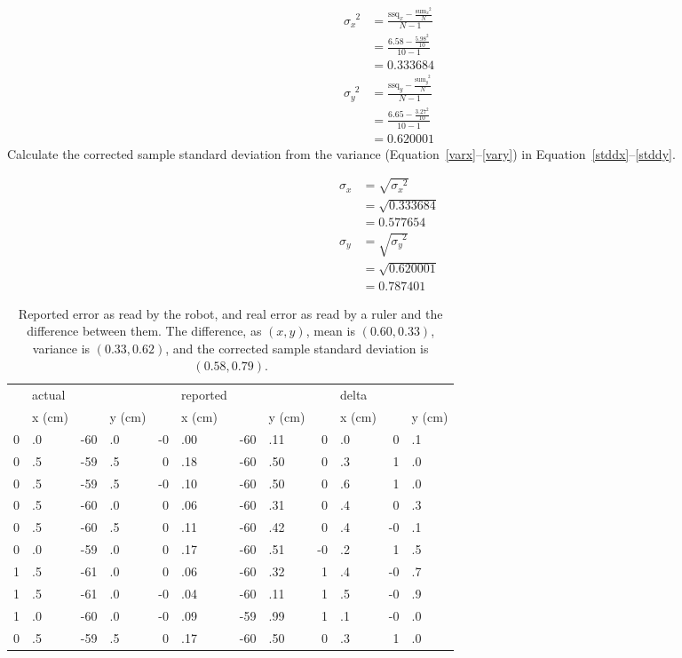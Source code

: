 \documentclass[twocolumn]{article}
\begin{document}
\begin{align}
\sigma_{x}^{\phantom{x}2} &= \frac{\text{ssq}_{x} - \frac{\text{sum}_{x}^{\phantom{x}2}}{N}}{N-1} \nonumber\\
 &= \frac{6.58 - \frac{5.98^2}{10}}{10-1} \nonumber\\
 &= 0.333684 \label{varx}\\
\sigma_{y}^{\phantom{y}2} &= \frac{\text{ssq}_{y} - \frac{\text{sum}_{y}^{\phantom{y}2}}{N}}{N-1} \nonumber\\
 &= \frac{6.65 - \frac{3.27^2}{10}}{10-1} \nonumber\\
 &= 0.620001 \label{vary}
\end{align}
Calculate the corrected sample standard deviation from the variance (Equation~\ref{varx}--\ref{vary}) in Equation~\ref{stddx}--\ref{stddy}.

\begin{align}
\sigma_x &= \sqrt{\sigma_{x}^{\phantom{x}2}} \nonumber\\
 &= \sqrt{0.333684} \nonumber\\
 &= 0.577654 \label{stddx}\\
\sigma_y &= \sqrt{\sigma_{y}^{\phantom{y}2}} \nonumber\\
 &= \sqrt{0.620001} \nonumber\\
 &= 0.787401 \label{stddy}
\end{align}
\begin{table*}[htb]
\begin{center}\begin{tabular}{r@{}l r@{}l r@{}l r@{}l r@{}l r@{}l}
&actual&&& &reported&&& &delta&& \\
&x (cm)& &y (cm)& &x (cm)& &y (cm)& &x (cm)& &y (cm) \\
\hline
0&.0& -60&.0& -0&.00& -60&.11& 0&.0& 0&.1 \\
0&.5& -59&.5& 0&.18& -60&.50& 0&.3& 1&.0 \\
0&.5& -59&.5& -0&.10& -60&.50& 0&.6& 1&.0 \\
0&.5& -60&.0& 0&.06& -60&.31& 0&.4& 0&.3 \\
0&.5& -60&.5& 0&.11& -60&.42& 0&.4& -0&.1 \\
0&.0& -59&.0& 0&.17& -60&.51& -0&.2& 1&.5 \\
1&.5& -61&.0& 0&.06& -60&.32& 1&.4& -0&.7 \\
1&.5& -61&.0& -0&.04& -60&.11& 1&.5& -0&.9 \\
1&.0& -60&.0& -0&.09& -59&.99& 1&.1& -0&.0 \\
0&.5& -59&.5& 0&.17& -60&.50& 0&.3& 1&.0 \\
\end{tabular}\end{center}
\caption{Reported error as read by the robot, and real error as read by a ruler and the difference between them.
The difference, as $(x, y)$, mean is $(0.60, 0.33)$, variance is $(0.33, 0.62)$, and the corrected sample standard deviation is $(0.58, 0.79)$.}
\label{a}
\end{table*}
\end{document}
